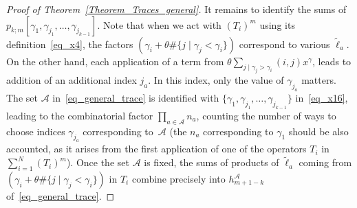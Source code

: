 \begin{proof}[Proof of Theorem~\ref{Theorem_Traces_general}]
It remains to identify the sums of $p_{k;m}[\gamma_1,\gamma_{j_1},\dots,\gamma_{j_{k-1}}]$. Note that when we act with $(T_i)^m$ using its definition~\eqref{eq_x4}, the factors $\left(\gamma_i + \theta \#\{j\mid \gamma_j<\gamma_i\}\right)$ correspond to various $\tilde \ell_a$. On the other hand, each application
of a term from $\theta \sum_{j\mid \gamma_j>\gamma_i} (i,j) x^{\gamma}$, leads to addition of an additional index ${j_a}$. In this index, only the value of $\gamma_{j_a}$ matters. The set $\mathcal A$ in~\eqref{eq_general_trace} is identified with $\{\gamma_1,\gamma_{j_1},\dots,\gamma_{j_{k-1}}\}$ in~\eqref{eq_x16}, leading to the combinatorial factor $\prod_{a\in \mathcal A} n_a$, counting the number of ways to choose indices $\gamma_{j_a}$ corresponding to~$\mathcal A$ (the $n_a$ corresponding to $\gamma_1$ should be also accounted, as it arises from the first application of one of the operators $T_i$ in $\sum_{i=1}^N (T_i)^m$). Once the set $\mathcal A$ is fixed, the sums of products of $\tilde \ell_a$ coming from $\left(\gamma_i + \theta \#\{j\mid \gamma_j<\gamma_i\}\right)$ in $T_i$ combine precisely into $h^{\mathcal A}_{m+1-k}$ of~\eqref{eq_general_trace}.
\end{proof}

